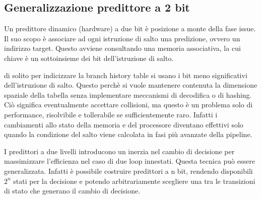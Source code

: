 \subsection{Generalizzazione predittore a 2 bit}
Un predittore dinamico (hardware) a due bit è posizione a monte della fase issue. Il suo scopo è associare ad ogni istruzione di salto una predizione, ovvero un indirizzo target. Questo avviene consultando una memoria associativa, la cui chiave è un sottoinsieme dei bit dell'istruzione di salto. 

\begin{warn}
    di solito per indicizzare la branch history table si usano i bit meno significativi dell'istruzione di salto. Questo perchè si vuole mantenere contenuta la dimensione spaziale della tabella senza implementare meccanismi di decodifica o di hashing. Ciò significa eventualmente accettare collisioni, ma questo è un problema solo di performance, risolvibile e tollerabile se sufficientemente raro. Infatti i cambiamenti allo stato della memoria e del processore diventano effettivi solo quando la condizione del salto viene calcolata in fasi più avanzate della pipeline.
\end{warn}

I predittori a due livelli introducono un inerzia nel cambio di decisione per massimizzare l'efficienza nel caso di due loop innestati. Questa tecnica può essere generalizzata. Infatti è possibile costruire predittori a n bit, rendendo disponibili $2^n$ stati per la decisione e potendo arbitrariamente scegliere una tra le transizioni di stato che generano il cambio di decisione.  

\begin{figure}[ht]
    \centering
    \setlength{\fboxrule}{0.5pt} %
    \setlength{\fboxsep}{0pt}    %
\end{figure}


